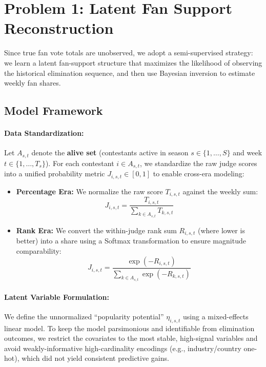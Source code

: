 \documentclass[12pt]{article}
\begin{document}
\section{Problem 1: Latent Fan Support Reconstruction}

Since true fan vote totals are unobserved, we adopt a semi-supervised strategy: we learn a latent fan-support structure that maximizes the likelihood of observing the historical elimination sequence, and then use Bayesian inversion to estimate weekly fan shares.

\subsection{Model Framework}


\paragraph{Data Standardization:}

Let $A_{s,t}$ denote the \textbf{alive set} (contestants active in season $s \in \{1,\dots,S\}$ and week $t \in \{1,\dots,T_s\}$). For each contestant $i \in A_{s,t}$, we standardize the raw judge scores into a unified probability metric $J_{i,s,t} \in [0,1]$ to enable cross-era modeling:

\begin{itemize}
	\item \textbf{Percentage Era:} We normalize the raw score $T_{i,s,t}$ against the weekly sum:
	\begin{equation}
		J_{i,s,t} = \frac{T_{i,s,t}}{\sum_{k \in A_{s,t}} T_{k,s,t}}
	\end{equation}
	\item \textbf{Rank Era:} We convert the within-judge rank sum $R_{i,s,t}$ (where lower is better) into a share using a Softmax transformation to ensure magnitude comparability:
	\begin{equation}
		J_{i,s,t} = \frac{\exp(-R_{i,s,t})}{\sum_{k \in A_{s,t}} \exp(-R_{k,s,t})}
	\end{equation}
\end{itemize}




\paragraph{Latent Variable Formulation:}

We define the unnormalized ``popularity potential'' $\eta_{i,s,t}$ using a mixed-effects linear model.
To keep the model parsimonious and identifiable from elimination outcomes, we restrict the covariates to
the most stable, high-signal variables and avoid weakly-informative high-cardinality encodings (e.g.,
industry/country one-hot), which did not yield consistent predictive gains.
\end{document}
